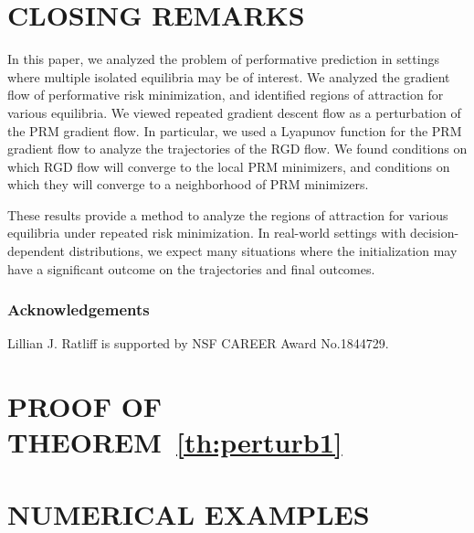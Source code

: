 \documentclass[twoside]{article}
\begin{document}

% 


\section{CLOSING REMARKS}
\label{sec:conclusion}

In this paper, we analyzed the problem of performative prediction in settings where multiple isolated equilibria may be of interest. We analyzed the gradient flow of performative risk minimization, and identified regions of attraction for various equilibria. We viewed repeated gradient descent flow as a perturbation of the PRM gradient flow. In particular, we used a Lyapunov function for the PRM gradient flow to analyze the trajectories of the RGD flow. We found conditions on which RGD flow will converge to the local PRM minimizers, and conditions on which they will converge to a neighborhood of PRM minimizers. 

These results provide a method to analyze the regions of attraction for various equilibria under repeated risk minimization. In real-world settings with decision-dependent distributions, we expect many situations where the initialization may have a significant outcome on the trajectories and final outcomes. 


\subsubsection*{Acknowledgements}
Lillian J. Ratliff is supported by NSF CAREER Award No.1844729.



\appendix
\onecolumn

\section{PROOF OF THEOREM~\ref{th:perturb1}}
\label{app:proof_perturb1}


\section{NUMERICAL EXAMPLES}
\label{sec:num_results}


\end{document}
